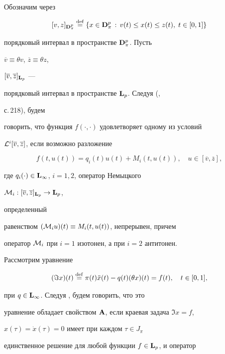 Обозначим через


$$


[v,z]_{\bold D_\pi^p}\overset{\mathrm{def}}{=}{}


\{x\in\bold D_\pi^p\,:\,v(t)\le x(t)\le z(t),\;t\in[0,1]\}


$$


порядковый интервал в пространстве $\bold D_\pi^p$. Пусть


$\overline {v}\equiv\theta v$, $\overline {z}\equiv\theta z$,


$[\overline {v},\overline {z}]_{\bold L_p}$ ---


порядковый интервал в пространстве $\bold L_p$. Следуя (\cite{1},


с.\,218), будем


говорить, что функция $f(\cdot,\cdot)$ удовлетворяет одному из условий


${\cal L}^i[\overline {v},\overline {z}]$, если возможно разложение


$$


f(t,u(t))=q_i(t)u(t)+M_i(t,u(t)),\quad u\in[\overline {v},\overline {z}],


$$


где $q_i(\cdot)\in\bold L_\infty$, $i=1,2$, оператор Немыцкого


${\cal M}_i:[\overline {v},\overline {z}]_{\bold L_p}\to \bold L_p$,


определенный


равенством $({\cal M}_iu)(t)\equiv M_i(t,u(t))$, непрерывен, причем


оператор ${\cal M}_i$ при $i=1$ изотонен, а при $i=2$ антитонен.





Рассмотрим уравнение


$$


(\Im x)(t)\overset{\mathrm{def}}{=}{}


\pi (t)\Ddot{x}(t)-q(t)(\theta x)(t)=f(t),\quad


t\in[0,1],


$$


при $q\in\bold L_\infty$. Следуя \cite{2}, будем говорить, что это


уравнение обладает свойством $\bold A$, если краевая задача $\Im x=f$,


$x(\tau)=\Dot{x}(\tau)=0$ имеет при каждом $\tau\in J_\pi$


единственное решение для любой функции $f\in\bold L_p$, и оператор



